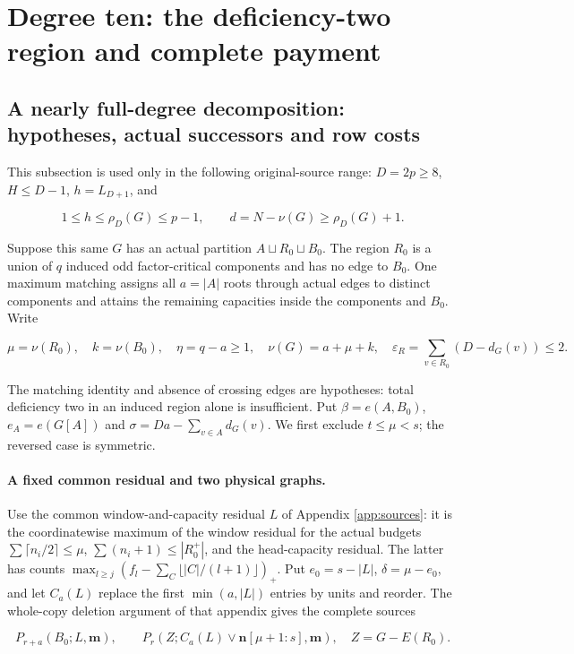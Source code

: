 \documentclass[11pt,a4paper]{article}
\newcommand{\nn}{\mathbf n}\newcommand{\mm}{\mathbf m}
\theoremstyle{definition}
\begin{document}
\section{Degree ten: the deficiency-two region and complete payment}\label{app:D10}
\subsection{A nearly full-degree decomposition: hypotheses, actual successors and row costs}
This subsection is used only in the following original-source range: $D=2p\ge8$, $H\le D-1$, $h=L_{D+1}$, and

\begin{equation}\label{eq:D10-original-domain}
 1\le h\le\rho_D(G)\le p-1,\qquad
 d=N-\nu(G)\ge\rho_D(G)+1.
\end{equation}

Suppose this same $G$ has an actual partition $A\sqcup R_0\sqcup B_0$. The region $R_0$ is a union of $q$ induced odd factor-critical components and has no edge to $B_0$. One maximum matching assigns all $a=|A|$ roots through actual edges to distinct components and attains the remaining capacities inside the components and $B_0$. Write

\[
 \mu=\nu(R_0),\quad k=\nu(B_0),\quad
 \eta=q-a\ge1,\quad \nu(G)=a+\mu+k,
 \quad \varepsilon_R=\sum_{v\in R_0}(D-d_G(v))\le2.
\]

The matching identity and absence of crossing edges are hypotheses: total deficiency two in an induced region alone is insufficient. Put $\beta=e(A,B_0)$, $e_A=e(G[A])$ and $\sigma=Da-\sum_{v\in A}d_G(v)$. We first exclude $t\le\mu<s$; the reversed case is symmetric.

\paragraph{A fixed common residual and two physical graphs.}
Use the common window-and-capacity residual $L$ of Appendix \ref{app:sources}: it is the coordinatewise maximum of the window residual for the actual budgets
$\sum\lceil n_i/2\rceil\le\mu$, $\sum(n_i+1)\le|R_0^+|$, and the head-capacity residual. The latter has counts
$\max_{l\ge j}(f_l-\sum_C\lfloor|C|/(l+1)\rfloor)_+$. Put $e_0=s-|L|$, $\delta=\mu-e_0$, and let $C_a(L)$ replace the first $\min(a,|L|)$ entries by units and reorder. The whole-copy deletion argument of that appendix gives the complete sources

\[
 P_{r+a}(B_0;L,\mm),\qquad
 P_r(Z;C_a(L)\vee\nn[\mu+1:s],\mm),\quad Z=G-E(R_0).
\]
\end{document}
